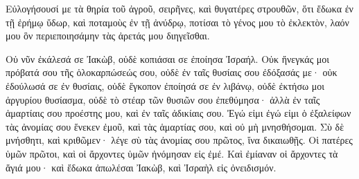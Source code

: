 {Εὐλογήσουσί με τὰ θηρία τοῦ ἀγροῦ, σειρῆνες, καὶ θυγατέρες στρουθῶν, ὅτι ἔδωκα ἐν τῇ ἐρήμῳ ὕδωρ, καὶ ποταμοὺς ἐν τῇ ἀνύδρῳ, ποτίσαι τὸ γένος μου τὸ ἐκλεκτὸν,
λαόν μου ὃν περιεποιησάμην τὰς ἀρετάς μου διηγεῖσθαι.
\par }{\PP {}Οὐ νῦν ἐκάλεσά σε Ἰακὼβ, οὐδὲ κοπιάσαι σε ἐποίησα Ἰσραήλ.
Οὐκ ἤνεγκάς μοι πρόβατά σου τῆς ὁλοκαρπώσεώς σου, οὐδὲ ἐν ταῖς θυσίαις σου ἐδόξασάς με· οὐκ ἐδούλωσά σε ἐν θυσίαις, οὐδὲ ἔγκοπον ἐποίησά σε ἐν λιβάνῳ,
οὐδὲ ἐκτήσω μοι ἀργυρίου θυσίασμα, οὐδὲ τὸ στέαρ τῶν θυσιῶν σου ἐπεθύμησα· ἀλλὰ ἐν ταῖς ἁμαρτίαις σου προέστης μου, καὶ ἐν ταῖς ἀδικίαις σου.
Ἐγώ εἰμι ἐγώ εἰμι ὁ ἐξαλείφων τὰς ἀνομίας σου ἕνεκεν ἐμοῦ, καὶ τὰς ἁμαρτίας σου, καὶ οὐ μὴ μνησθήσομαι.
Σὺ δὲ μνήσθητι, καὶ κριθῶμεν· λέγε σὺ τὰς ἀνομίας σου πρῶτος, ἵνα δικαιωθῇς.
Οἱ πατέρες ὑμῶν πρῶτοι, καὶ οἱ ἄρχοντες ὑμῶν ἠνόμησαν εἰς ἐμέ.
Καὶ ἐμίαναν οἱ ἄρχοντες τὰ ἅγιά μου· καὶ ἔδωκα ἀπωλέσαι Ἰακὼβ, καὶ Ἰσραὴλ εἰς ὀνειδισμόν.

}
